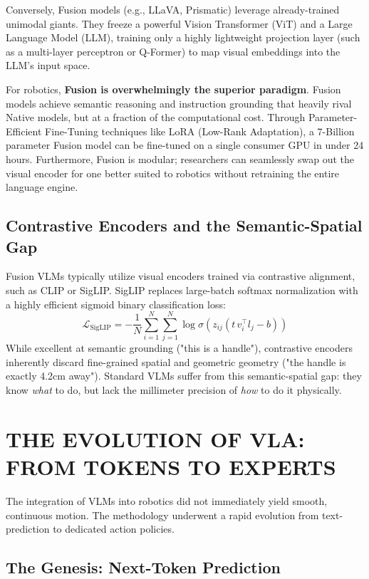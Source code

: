 Conversely, Fusion models (e.g., LLaVA, Prismatic) leverage already-trained unimodal giants. They freeze a powerful Vision Transformer (ViT) and a Large Language Model (LLM), training only a highly lightweight projection layer (such as a multi-layer perceptron or Q-Former) to map visual embeddings into the LLM's input space. 

For robotics, \textbf{Fusion is overwhelmingly the superior paradigm}. Fusion models achieve semantic reasoning and instruction grounding that heavily rival Native models, but at a fraction of the computational cost. Through Parameter-Efficient Fine-Tuning techniques like LoRA (Low-Rank Adaptation), a 7-Billion parameter Fusion model can be fine-tuned on a single consumer GPU in under 24 hours. Furthermore, Fusion is modular; researchers can seamlessly swap out the visual encoder for one better suited to robotics without retraining the entire language engine.

\subsection{Contrastive Encoders and the Semantic-Spatial Gap}

Fusion VLMs typically utilize visual encoders trained via contrastive alignment, such as CLIP or SigLIP. SigLIP replaces large-batch softmax normalization with a highly efficient sigmoid binary classification loss:
\begin{equation}
    \mathcal{L}_{\mathrm{SigLIP}} = -\frac{1}{N}\sum_{i=1}^{N}\sum_{j=1}^{N} \log\sigma\!\left(z_{ij}\left(t\, v_i^\top l_j - b\right)\right)
\end{equation}
While excellent at semantic grounding ("this is a handle"), contrastive encoders inherently discard fine-grained spatial and geometric geometry ("the handle is exactly 4.2cm away"). Standard VLMs suffer from this semantic-spatial gap: they know \textit{what} to do, but lack the millimeter precision of \textit{how} to do it physically.

\section{THE EVOLUTION OF VLA: FROM TOKENS TO EXPERTS}

The integration of VLMs into robotics did not immediately yield smooth, continuous motion. The methodology underwent a rapid evolution from text-prediction to dedicated action policies.

\subsection{The Genesis: Next-Token Prediction}

